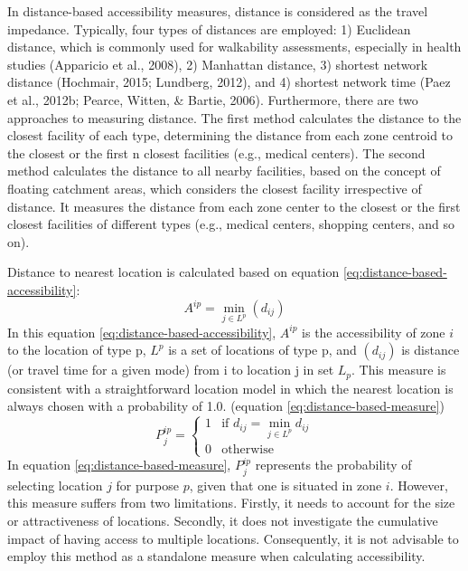 \documentclass[12pt,twoside]{reedthesis}
\begin{document}
In distance-based accessibility measures, distance is considered as the travel impedance. Typically, four types of distances are employed: 1) Euclidean distance, which is commonly used for walkability assessments, especially in health studies (Apparicio et al., 2008), 2) Manhattan distance, 3) shortest network distance (Hochmair, 2015; Lundberg, 2012), and 4) shortest network time (Paez et al., 2012b; Pearce, Witten, \& Bartie, 2006). Furthermore, there are two approaches to measuring distance. The first method calculates the distance to the closest facility of each type, determining the distance from each zone centroid to the closest or the first n closest facilities (e.g., medical centers). The second method calculates the distance to all nearby facilities, based on the concept of floating catchment areas, which considers the closest facility irrespective of distance. It measures the distance from each zone center to the closest or the first closest facilities of different types (e.g., medical centers, shopping centers, and so on).

Distance to nearest location is calculated based on equation \eqref{eq:distance-based-accessibility}:
\begin{equation}
A^{ip} = \min_{j \in L^p} (d_{ij})
\label{eq:distance-based-accessibility}
\end{equation}
In this equation \eqref{eq:distance-based-accessibility}, \(A^{ip}\) is the accessibility of zone \(i\) to the location of type p, \(L^p\) is a set of locations of type p, and \((d_{ij})\) is distance (or travel time for a given mode) from i to location j in set \(L_p\). This measure is consistent with a straightforward location model in which the nearest location is always chosen with a probability of 1.0. (equation \eqref{eq:distance-based-measure})
\begin{equation}
P^{ip}_j = 
\begin{cases}
  1 & \text{if } d_{ij} = \min_{j \in L^p} d_{ij} \\
  0 & \text{otherwise}
\end{cases}
\label{eq:distance-based-measure}
\end{equation}
In equation \eqref{eq:distance-based-measure}, \(P_j^{ip}\) represents the probability of selecting location \(j\) for purpose \(p\), given that one is situated in zone \(i\). However, this measure suffers from two limitations. Firstly, it needs to account for the size or attractiveness of locations. Secondly, it does not investigate the cumulative impact of having access to multiple locations. Consequently, it is not advisable to employ this method as a standalone measure when calculating accessibility.
\end{document}
